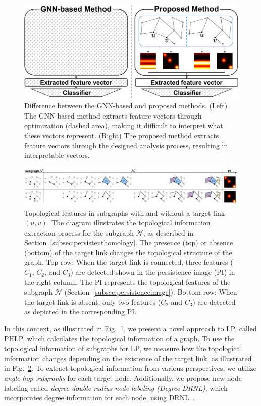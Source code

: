 \begin{figure}[!t]
\centering
\includegraphics[width=\linewidth]{figures/Blackbox.drawio.pdf} 
\caption{ Difference between the GNN-based and proposed methods.
(Left) The GNN-based method extracts feature vectors through optimization (dashed area), making it difficult to interpret what these vectors represent. (Right) The proposed method extracts feature vectors through the designed analysis process, resulting in interpretable vectors.}
\label{fig:Blackbox}
\end{figure}

\begin{figure}[!htbp]
\centering
\includegraphics[width=\linewidth]{figures/Filtraion.intro.pdf}
\vspace{-7mm}
\caption{Topological features in subgraphs with and without a target link $(u,v)$.
The diagram illustrates the topological information extraction process for the subgraph $\mathcal{N}$, as described in Section~\ref{subsec:persistenthomology}. 
The presence (top) or absence (bottom) of the target link changes the topological structure of the graph. 
Top row: When the target link is connected, three features ($C_1$, $C_2$, and $C_3$) are detected shown in the persistence image (PI) in the right column.
The PI represents the topological features of the subgraph $\mathcal{N}$ (Section~\ref{subsec:persistenceimage}).
Bottom row: When the target link is absent, only two features ($C_2$ and $C_3$) are detected as depicted in the corresponding PI. }
\label{motivation}
\end{figure}

In this context, as illustrated in Fig.~\ref{fig:Blackbox}, we present a novel approach to LP, called PHLP, which calculates the topological information of a graph.
To use the topological information of subgraphs for LP, we measure how the topological information changes depending on the existence of the target link, as illustrated in Fig.~\ref{motivation}.
To extract topological information from various perspectives, we utilize \textit{angle hop subgraphs} for each target node. 
Additionally, we propose new node labeling called \textit{degree double radius node labeling (Degree DRNL)}, which incorporates degree information for each node, using DRNL~\cite{zhang2018link}.

